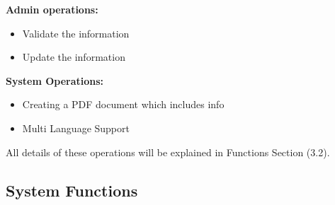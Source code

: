 \textbf{Admin operations: }
\begin{itemize}
    \item Validate the information
    \item Update the information
\end{itemize}

\textbf{System Operations: }
\begin{itemize}
    \item Creating a PDF document which includes info
    \item Multi Language Support
\end{itemize}

All details of these operations will be explained in Functions Section (3.2).

\subsection{System Functions}


